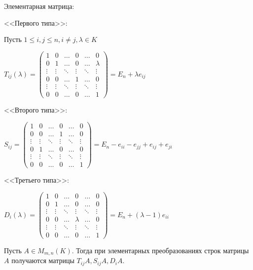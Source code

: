 \begin{defn} Элементарная матрица:
    
    <<Первого типа>>:

    Пусть $1 \leq i, j \leq n, i \neq j, \lambda \in K$


    $T_{ij}(\lambda) = \begin{pmatrix}
        1 & 0 & \ldots & 0 & \ldots & 0 \\
        0 & 1 & \ldots & 0 & \ldots & \lambda \\
        \vdots & \vdots & \ddots & \vdots & \ddots & \vdots \\
        0 & 0 & \ldots & 1 & \ldots & 0 \\
        \vdots & \vdots & \ddots & \vdots & \ddots & \vdots \\
        0 & 0 & \ldots & 0 & \ldots & 1
    \end{pmatrix} = E_n + \lambda e_{ij}$

    <<Второго типа>>:

    $S_{ij} = \begin{pmatrix}
        1 & 0 & \ldots & 0 & \ldots & 0 \\
        0 & 0 & \ldots & 1 & \ldots & 0 \\
        \vdots & \vdots & \ddots & \vdots & \ddots & \vdots \\
        0 & 1 & \ldots & 0 & \ldots & 0 \\
        \vdots & \vdots & \ddots & \vdots & \ddots & \vdots \\
        0 & 0 & \ldots & 0 & \ldots & 1
    \end{pmatrix} = E_n - e_{ii} - e_{jj} + e_{ij} + e_{ji}$

    <<Третьего типа>>:

    $D_i(\lambda) = \begin{pmatrix}
        1 & 0 & \ldots & 0 & \ldots & 0 \\
        0 & 1 & \ldots & 0 & \ldots & 0 \\
        \vdots & \vdots & \ddots & \vdots & \ddots & \vdots \\
        0 & 0 & \ldots & \lambda & \ldots & 0 \\
        \vdots & \vdots & \ddots & \vdots & \ddots & \vdots \\
        0 & 0 & \ldots & 0 & \ldots & 1
    \end{pmatrix} = E_n + (\lambda - 1) e_{ii}$
\end{defn}

\begin{theorem-non}
    Пусть $A \in M_{m, n}(K)$. Тогда при элементарных преобразованиях строк матрицы $A$ получаются матрицы $T_{ij} A, S_{ij} A, D_i A$.
\end{theorem-non}

